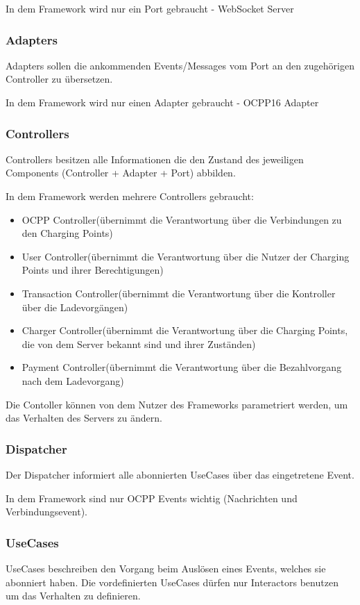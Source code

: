         In dem Framework wird nur ein Port gebraucht - WebSocket Server
        \subsubsection{Adapters}
        Adapters sollen die ankommenden Events/Messages vom Port an den zugehörigen Controller zu übersetzen.

        In dem Framework wird nur einen Adapter gebraucht - OCPP16 Adapter
        \subsubsection{Controllers}
        Controllers besitzen alle Informationen die den Zustand des jeweiligen Components (Controller + Adapter + Port) abbilden.

        In dem Framework werden mehrere Controllers gebraucht:
        \begin{itemize}
            \item OCPP Controller(übernimmt die Verantwortung über die Verbindungen zu den Charging Points)
            \item User Controller(übernimmt die Verantwortung über die Nutzer der Charging Points und ihrer Berechtigungen)
            \item Transaction Controller(übernimmt die Verantwortung über die Kontroller über die Ladevorgängen)
            \item Charger Controller(übernimmt die Verantwortung über die Charging Points, die von dem Server bekannt sind und ihrer Zuständen)
            \item Payment Controller(übernimmt die Verantwortung über die Bezahlvorgang nach dem Ladevorgang)
        \end{itemize}

        Die Contoller können von dem Nutzer des Frameworks parametriert werden, um das Verhalten des Servers zu ändern.
        \subsubsection{Dispatcher}
        Der Dispatcher informiert alle abonnierten UseCases über das eingetretene Event.

        In dem Framework sind nur OCPP Events wichtig (Nachrichten und Verbindungsevent).
        \subsubsection{UseCases}
        UseCases beschreiben den Vorgang beim Auslösen eines Events, welches sie abonniert haben.
        Die vordefinierten UseCases dürfen nur Interactors benutzen um das Verhalten zu definieren.

